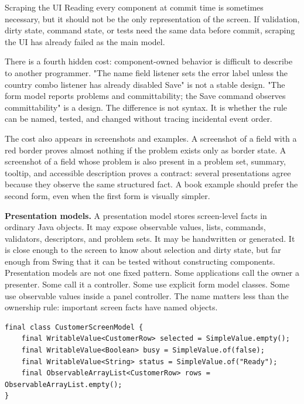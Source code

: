 \begin{pitfallbox}{Scraping the UI}
Reading every component at commit time is sometimes necessary, but it should not be the only representation of the screen. If validation, dirty state, command state, or tests need the same data before commit, scraping the UI has already failed as the main model.
\end{pitfallbox}

There is a fourth hidden cost: component-owned behavior is difficult to describe to another programmer. "The name field listener sets the error label unless the country combo listener has already disabled Save" is not a stable design. "The form model reports problems and committability; the Save command observes committability" is a design. The difference is not syntax. It is whether the rule can be named, tested, and changed without tracing incidental event order.

The cost also appears in screenshots and examples. A screenshot of a field with a red border proves almost nothing if the problem exists only as border state. A screenshot of a field whose problem is also present in a problem set, summary, tooltip, and accessible description proves a contract: several presentations agree because they observe the same structured fact. A book example should prefer the second form, even when the first form is visually simpler.

\textbf{Presentation models.} A presentation model stores screen-level facts in ordinary Java objects. It may expose observable values, lists, commands, validators, descriptors, and problem sets. It may be handwritten or generated. It is close enough to the screen to know about selection and dirty state, but far enough from Swing that it can be tested without constructing components. Presentation models are not one fixed pattern. Some applications call the owner a presenter. Some call it a controller. Some use explicit form model classes. Some use observable values inside a panel controller. The name matters less than the ownership rule: important screen facts have named objects.

\begin{lstlisting}[caption={A small presentation-state sketch.}]
final class CustomerScreenModel {
    final WritableValue<CustomerRow> selected = SimpleValue.empty();
    final WritableValue<Boolean> busy = SimpleValue.of(false);
    final WritableValue<String> status = SimpleValue.of("Ready");
    final ObservableArrayList<CustomerRow> rows = ObservableArrayList.empty();
}
\end{lstlisting}

